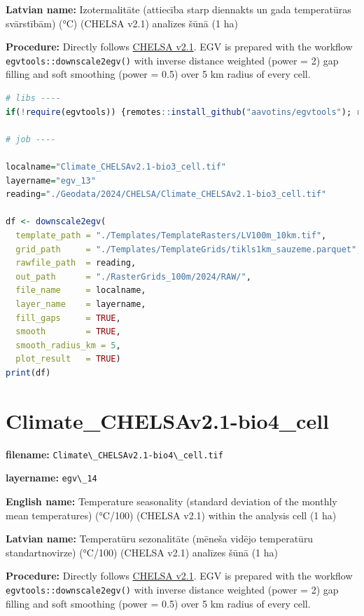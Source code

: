 \documentclass[
]{book}
\newcommand{\passthrough}[1]{#1}
\begin{document}
\textbf{Latvian name:} Izotermalitāte (attiecība starp diennakts un gada temperatūras svārstībām) (°C) (CHELSA v2.1) analīzes šūnā (1 ha)

\textbf{Procedure:} Directly follows \hyperref[Ch04.11]{CHELSA v2.1}. EGV is prepared with the
workflow \passthrough{\lstinline!egvtools::downscale2egv()!} with inverse distance weighted (power = 2)
gap filling and soft smoothing (power = 0.5) over 5 km radius of every cell.

\begin{lstlisting}[language=R]
# libs ----
if(!require(egvtools)) {remotes::install_github("aavotins/egvtools"); require(egvtools)}

# job ----

localname="Climate_CHELSAv2.1-bio3_cell.tif"
layername="egv_13"
reading="./Geodata/2024/CHELSA/Climate_CHELSAv2.1-bio3_cell.tif"

df <- downscale2egv(
  template_path = "./Templates/TemplateRasters/LV100m_10km.tif",
  grid_path     = "./Templates/TemplateGrids/tikls1km_sauzeme.parquet",
  rawfile_path  = reading,
  out_path      = "./RasterGrids_100m/2024/RAW/",
  file_name     = localname,
  layer_name    = layername,
  fill_gaps     = TRUE,
  smooth        = TRUE,
  smooth_radius_km = 5,
  plot_result   = TRUE)
print(df)
\end{lstlisting}

\section{Climate\_CHELSAv2.1-bio4\_cell}\label{ch06.014}

\textbf{filename:} \passthrough{\lstinline!Climate\_CHELSAv2.1-bio4\_cell.tif!}

\textbf{layername:} \passthrough{\lstinline!egv\_14!}

\textbf{English name:} Temperature seasonality (standard deviation of the monthly mean temperatures) (°C/100) (CHELSA v2.1) within the analysis cell (1 ha)

\textbf{Latvian name:} Temperatūru sezonalitāte (mēneša vidējo temperatūru standartnovirze) (°C/100) (CHELSA v2.1) analīzes šūnā (1 ha)

\textbf{Procedure:} Directly follows \hyperref[Ch04.11]{CHELSA v2.1}. EGV is prepared with the
workflow \passthrough{\lstinline!egvtools::downscale2egv()!} with inverse distance weighted (power = 2)
gap filling and soft smoothing (power = 0.5) over 5 km radius of every cell.
\end{document}

